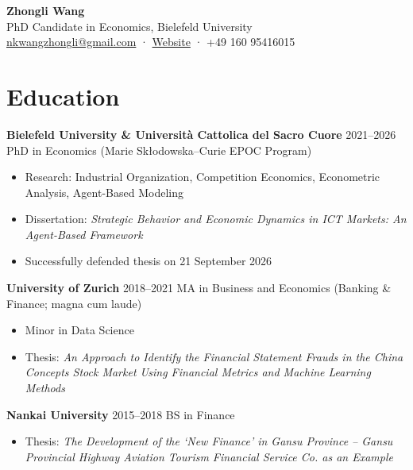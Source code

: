\documentclass[a4paper,11pt]{article}
\begin{document}
\begin{center}
{\LARGE \textbf{Zhongli Wang}}\\[4pt]
PhD Candidate in Economics, Bielefeld University\\
\href{mailto:nkwangzhongli@gmail.com}{nkwangzhongli@gmail.com} · 
\href{https://sites.google.com/view/zhongli-wang}{Website} · 
+49 160 95416015
\end{center}

\section{Education}

\textbf{Bielefeld University \& Università Cattolica del Sacro Cuore} \hfill 2021–2026  
\newline PhD in Economics (Marie Skłodowska–Curie EPOC Program)  
\begin{itemize}
\item Research: Industrial Organization, Competition Economics, Econometric Analysis, Agent-Based Modeling  
\item Dissertation: \emph{Strategic Behavior and Economic Dynamics in ICT Markets: An Agent-Based Framework}  
\item Successfully defended thesis on 21 September 2026  
\end{itemize}

\textbf{University of Zurich} \hfill 2018–2021  
\newline MA in Business and Economics (Banking \& Finance; magna cum laude)  
\begin{itemize}
\item Minor in Data Science  
\item Thesis: \textit{An Approach to Identify the Financial Statement Frauds in the China Concepts Stock Market Using Financial Metrics and Machine Learning Methods}   
\end{itemize}

\textbf{Nankai University} \hfill 2015–2018  
\newline BS in Finance  
\begin{itemize}
    \item Thesis: \textit{The Development of the `New Finance' in Gansu Province – Gansu Provincial Highway Aviation Tourism Financial Service Co. as an Example}
\end{itemize}
\end{document}
